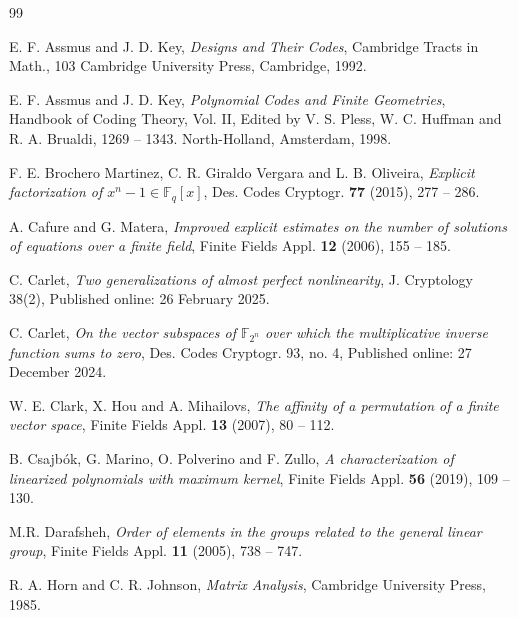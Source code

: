 \documentclass{amsart}
\numberwithin{equation}{section}
\theoremstyle{definition}
\newcommand{\f}{\Bbb F}
\begin{document}
\begin{thebibliography}{99}

 E. F. Assmus and J. D. Key, {\it Designs and Their Codes}, Cambridge Tracts in Math., 103 Cambridge University Press, Cambridge, 1992.

 E. F. Assmus and J. D. Key, {\it Polynomial Codes and Finite Geometries}, Handbook of Coding Theory, Vol. II, Edited by V. S. Pless, W. C. Huffman and R. A. Brualdi, 1269 -- 1343. North-Holland, Amsterdam, 1998.

 F. E. Brochero Martinez, C. R. Giraldo Vergara and L. B. Oliveira, {\it Explicit factorization of $x^n-1\in \mathbb{F}_q [x]$}, Des. Codes Cryptogr. {\bf 77} (2015), 277 -- 286.

A. Cafure and G. Matera, {\it Improved explicit estimates on the number of solutions of equations over a finite field}, Finite Fields Appl.  {\bf 12} (2006), 155 -- 185.



C. Carlet,  {\it Two generalizations of almost perfect nonlinearity}, J. Cryptology 38(2), Published online: 26 February 2025. %

C. Carlet, {\it On the vector subspaces of $\mathbb F_{2^n}$ over which the multiplicative inverse function sums to zero}, Des. Codes Cryptogr. 93, no. 4, Published online: 27 December 2024. %

 W. E. Clark, X. Hou and A. Mihailovs, {\it The affinity of a permutation of a finite vector space}, Finite Fields Appl. {\bf 13} (2007), 80 -- 112.

 B. Csajb\'ok, G. Marino, O. Polverino and F. Zullo, {\it A characterization of linearized polynomials with maximum kernel}, Finite Fields Appl. {\bf 56} (2019), 109 -- 130.

 M.R. Darafsheh, {\it Order of elements in the groups related to the general linear group}, Finite Fields Appl. {\bf 11} (2005), 738 -- 747.

 R. A. Horn and C. R. Johnson, {\em Matrix Analysis}, Cambridge University Press, 1985.


\end{thebibliography}
\end{document}
